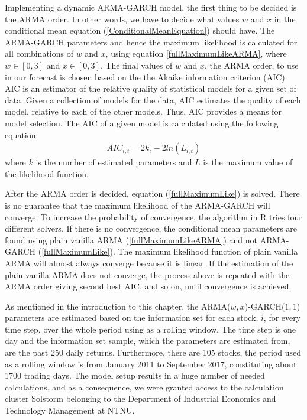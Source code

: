 Implementing a dynamic ARMA-GARCH model, the first thing to be decided is the ARMA order. In other words, we have to decide what values $w$ and $x$ in the conditional mean equation (\ref{ConditionalMeanEquation}) should have. The ARMA-GARCH parameters and hence the maximum likelihood is calculated for all combinations of $w$ and $x$, using equation \ref{fullMaximumLikeARMA}, where $w\in[0,3]$ and $x\in[0,3]$. The final values of $w$ and $x$, the ARMA order, to use in our forecast is chosen based on the the Akaike information criterion (AIC). AIC is an estimator of the relative quality of statistical models for a given set of data. Given a collection of models for the data, AIC estimates the quality of each model, relative to each of the other models. Thus, AIC provides a means for model selection. The AIC of a given model is calculated using the following equation:
\begin{align}
    AIC_{i,t}=2k_i-2ln(L_{i,t})
\end{align}
where $k$ is the number of estimated parameters and $L$ is the maximum value of the likelihood function. 

After the ARMA order is decided, equation (\ref{fullMaximumLike}) is solved. There is no guarantee that the maximum likelihood of the ARMA-GARCH will converge. To increase the probability of convergence, the algorithm in R tries four different solvers. If there is no convergence, the conditional mean parameters are found using plain vanilla ARMA (\ref{fullMaximumLikeARMA}) and not ARMA-GARCH (\ref{fullMaximumLike}). The maximum likelihood function of plain vanilla ARMA will almost always converge because it is linear. If the estimation of the plain vanilla ARMA does not converge, the process above is repeated with the ARMA order giving second best AIC, and so on, until convergence is achieved.

As mentioned in the introduction to this chapter, the ARMA($w,x$)-GARCH($1,1$) parameters are estimated based on the information set for each stock, $i$, for every time step, over the whole period using as a rolling window. The time step is one day and the information set sample, which the parameters are estimated from, are the past 250 daily returns. Furthermore, there are 105 stocks, the period used as a rolling window is from January 2011 to September 2017, constituting about 1700 trading days. The model setup results in a huge number of needed calculations, and as a consequence, we were granted access to the calculation cluster Solstorm belonging to the Department of Industrial Economics and Technology Management at NTNU. 

